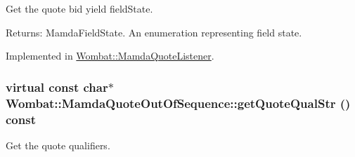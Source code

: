 Get the quote bid yield field\-State. 

\begin{Desc}
\item[Returns:]Mamda\-Field\-State. An enumeration representing field state. \end{Desc}


Implemented in \hyperlink{classWombat_1_1MamdaQuoteListener_19d19b0f64db3586e14b88f4a502ecbf}{Wombat::Mamda\-Quote\-Listener}.\hypertarget{classWombat_1_1MamdaQuoteOutOfSequence_0207954904250e999a94c275c9b77192}{
\subsubsection[getQuoteQualStr]{\setlength{\rightskip}{0pt plus 5cm}virtual const char$\ast$ Wombat::Mamda\-Quote\-Out\-Of\-Sequence::get\-Quote\-Qual\-Str () const}}
\label{classWombat_1_1MamdaQuoteOutOfSequence_0207954904250e999a94c275c9b77192}


Get the quote qualifiers. 

